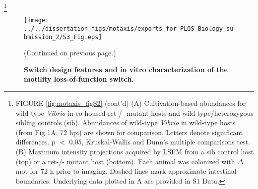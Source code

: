 {{{{{{{{{\let\thefootnote\relax\footnote{FIGURE \ref{fig:motaxis_figS2} (cont'd) (A) Cultivation-based abundances for wild-type \textit{Vibrio} in co-housed ret-/- mutant hosts and wild-type/heterozygous sibling controls (sib). Abundances of wild-type \textit{Vibrio} in wild-type hosts (from Fig 1A, 72 hpi) are shown for comparison. Letters denote significant differences. p $ < $ 0.05, Kruskal-Wallis and Dunn's multiple comparisons test. (B) Maximum intensity projections acquired by LSFM from a sib control host (top) or a ret-/- mutant host (bottom). Each animal was colonized with $\Delta$mot for 72 h prior to imaging. Dashed lines mark approximate intestinal boundaries. Underlying data plotted in A are provided in S1 Data.}

\newpage

\begin{figure}%
	\centerline{
		\texttt{[image: ../../dissertation\_figs/motaxis/exports\_for\_PLOS\_Biology\_submission\_2/S3\_Fig.eps]}}
	\caption{\textbf{Switch design features and in vitro characterization of the motility loss-of-function switch.}}{(Continued on previous page.)}
	\label{fig:motaxis_figS3}
\end{figure}
		
}}}}}}}}}
